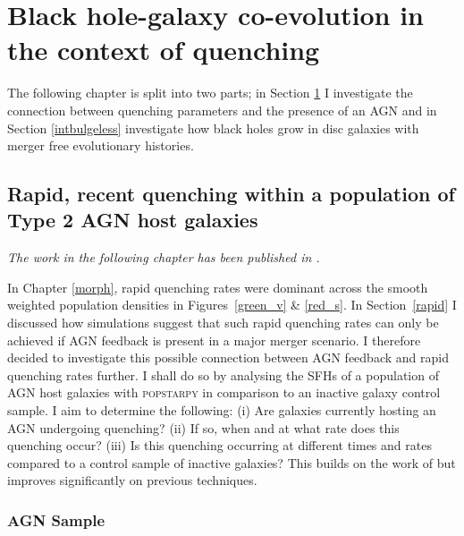 
\chapter{Black hole-galaxy co-evolution in the context of quenching}\label{agnfeedback}

The following chapter is split into two parts; in Section \ref{agnfeedback} I investigate the connection between quenching parameters and the presence of an AGN and in Section \ref{intbulgeless} investigate how black holes grow in disc galaxies with merger free evolutionary histories. 

\section{Rapid, recent quenching within a population of Type 2 AGN host galaxies}\label{sec:agnfeedback}

\emph{The work in the following chapter has been published in \citet{smethurst16}.}

In Chapter \ref{morph}, rapid quenching rates were dominant across the smooth weighted population densities in Figures~\ref{green_v} \& \ref{red_s}. In Section~\ref{rapid} I discussed how simulations suggest that such rapid quenching rates can only be achieved if AGN feedback is present in a major merger scenario. I therefore decided to investigate this possible connection between AGN feedback and rapid quenching rates further. I shall do so by analysing the SFHs of a population of AGN host galaxies with \textsc{popstarpy} in comparison to an inactive galaxy control sample. I  aim to determine the following: (i) Are galaxies currently hosting an AGN undergoing quenching? (ii) If so, when and at what rate does this quenching occur? (iii) Is this quenching occurring at different times and rates compared to a control sample of inactive galaxies? This builds on the work of \citet{Martin07} but improves significantly on previous techniques.

\subsection{AGN Sample}\label{agnsample}

